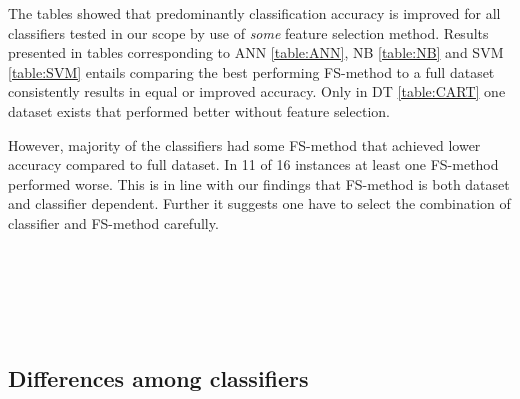 The tables showed that predominantly classification accuracy is improved for all classifiers tested in our scope by use of \textit{some} feature selection method. Results presented in tables corresponding to ANN \ref{table:ANN}, NB \ref{table:NB} and SVM \ref{table:SVM} entails comparing the best performing FS-method to a full dataset consistently results in equal or improved accuracy. Only in DT \ref{table:CART} one dataset exists that performed better without feature selection.

However, majority of the classifiers had some FS-method that achieved lower accuracy compared to full dataset. In 11 of 16 instances at least one FS-method performed worse. This is in line with our findings that FS-method is both dataset and classifier dependent. Further it suggests one have to select the combination of classifier and FS-method carefully.

\begin{table}[h]
  
  \caption[]%
  {{\small Classification accuracy achieved by ANN was improved on all datasets by the use of some feature selection method.}}
  \label{table:ANN}
\end{table}

\begin{table}[h]
   \\
  \caption[]%
  {{\small All datasets except MIAS benefited from feature selection using CART Decision Tree classifier.}}
  \label{table:CART}
\end{table}

\begin{table}[h]
   \\
  \caption[]%
  {{\small Naive Bayes sees improvement or equivalent accuracy by feature selection on every dataset.}}
  \label{table:NB}
\end{table}

\begin{table}[h]
   \\
  \caption[]%
  {{\small Classification accuracy achieved by SVM was improved or equivalent on every dataset with use of feature selection.}}
  \label{table:SVM}
\end{table}


\subsection{Differences among classifiers}

